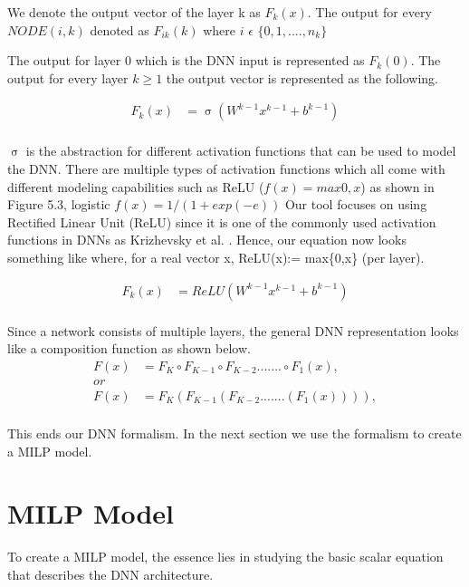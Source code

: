 We denote the output vector of the layer k as $F_k(x)$.
The output for every $NODE(i,k)$ denoted as $F_{ik}(k)$ where $i$ $\epsilon$ $\{0,1,....,n_k\}$ 

The output for layer 0 which is the \ac{DNN} input is represented as $F_k(0)$.
The output for every layer $k \geq 1$ the output vector is represented as  the following. 

\begin{equation}
\begin{aligned}
F_k(x) &= \upsigma(W^{k-1}x^{k-1} + b^{k-1}) \\
\end{aligned}
\end{equation}

$\upsigma$ is the abstraction for different activation functions that can be used to model the DNN. 
There are multiple types of activation functions which all come with different modeling capabilities such as ReLU ($f(x) = max {0,x}$) as shown in Figure 5.3, logistic $f(x)=1/(1+ exp(-e))$
Our tool focuses on using Rectified Linear Unit (ReLU) since it is one of the commonly used activation functions in \ac{DNN}s as Krizhevsky et al. \cite{10.1145/3065386}. 
Hence, our equation now looks  something like where, for a real vector x, ReLU(x):= max\{0,x\} (per layer).

\begin{equation}
\begin{aligned}
F_k(x) &= ReLU(W^{k-1}x^{k-1} + b^{k-1}) \\
\end{aligned}
\end{equation}

Since a network consists of multiple layers, the general \ac{DNN} representation looks like a composition function as shown below. 
\begin{equation}
	\begin{aligned}
	F(x) &= F_K \circ F_{K-1} \circ F_{K-2} ....... \circ F_1(x),    \\
	or \\
	F(x) &= F_K ( F_{K-1}( F_{K-2} .......  (F_1(x)))),    \\
	\end{aligned}
\end{equation}

This ends our \ac{DNN} formalism. In the next section we use the formalism to create a \ac{MILP} model. 

\section{MILP Model}
To create a \ac{MILP} model, the essence lies in studying the basic scalar equation that describes the \ac{DNN} architecture. 

